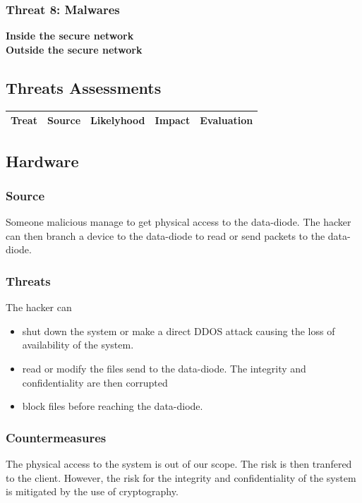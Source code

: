 \documentclass[a4paper,11pt]{article}
\begin{document}
\subsubsection{Threat 8: Malwares}
\textbf{Inside the secure network}\\
\textbf{Outside the secure network}\\

\subsection{Threats Assessments}
\begin{tabular}{|c|c|c|c|c|}
\hline
Treat & Source & Likelyhood & Impact & Evaluation \\
\hline

\end{tabular}




\subsection{Hardware}
\subsubsection{Source}
Someone malicious manage to get physical access to the data-diode. The hacker can then branch a device to the data-diode to read or send packets to the data-diode.
\subsubsection{Threats}
The hacker can
\begin{itemize}
\item shut down the system or make a direct DDOS attack causing the loss of availability of the system.
\item read or modify the files send to the data-diode. The integrity and confidentiality are then corrupted
\item block files before reaching the data-diode.
\end{itemize}
\subsubsection{Countermeasures}
The physical access to the system is out of our scope. The risk is then tranfered to the client. However, the risk for the integrity and confidentiality of the system is mitigated by the use of cryptography.
\end{document}
